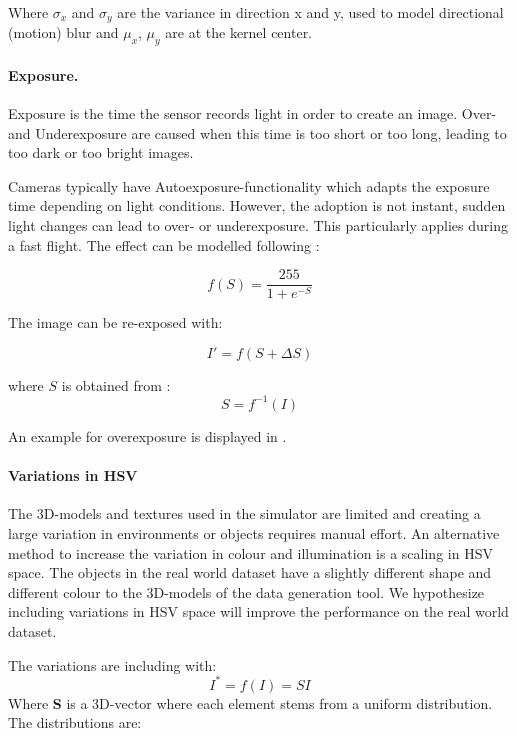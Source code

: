 Where $\sigma_x$ and $\sigma_y$ are the variance in direction x and y, used to model directional (motion) blur and $\mu_x$, $\mu_y$ are at the kernel center. 

\paragraph{Exposure.}

Exposure is the time the sensor records light in order to create an image. Over- and Underexposure are caused when this time is too short or too long, leading to too dark or too bright images.

Cameras typically have Autoexposure-functionality which adapts the exposure time depending on light conditions. However, the adoption is not instant, sudden light changes can lead to over- or underexposure. This particularly applies during a fast flight. The effect can be modelled following \cite{Carlson2018}:

\begin{equation}
f(S) = \frac{255}{1 + e^{-S}}
\end{equation}

The image can be re-exposed with:

\begin{equation}
I' = f(S+\Delta S)
\end{equation}

where $S$ is obtained from :
\begin{equation}
S = f^{-1}(I)
\end{equation}

An example for overexposure is displayed in . 

\paragraph{Variations in \ac{HSV}}

The 3D-models and textures used in the simulator are limited and creating a large variation in environments or objects requires manual effort. An alternative method to increase the variation in colour and illumination is a scaling in HSV space. The objects in the real world dataset have a slightly different shape and different colour to the 3D-models of the data generation tool. We hypothesize including variations in HSV space will improve the performance on the real world dataset.

The variations are including with:
\begin{equation}
I^* = f(I) = S I
\end{equation}
Where \textbf{S} is a 3D-vector where each element stems from a uniform distribution. The distributions are:

